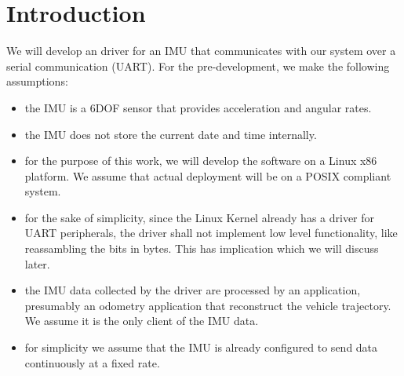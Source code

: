 \section{Introduction}
We will develop an driver for an IMU that communicates with our system over a serial communication (UART).
For the pre-development, we make the following assumptions:
\begin{itemize}
    \item the IMU is a 6DOF sensor that provides acceleration and angular rates.
    \item the IMU does not store the current date and time internally.
    \item for the purpose of this work, we will develop the software on a Linux x86 platform. We assume that actual deployment will be on a POSIX compliant system.
    \item for the sake of simplicity, since the Linux Kernel already has a driver for UART peripherals, the driver shall not implement low level functionality, like reassambling the bits in bytes. This has implication which we will discuss later.
    \item the IMU data collected by the driver are processed by an application, presumably an odometry application that reconstruct the vehicle trajectory.
    We assume it is the only client of the IMU data.
    \item for simplicity we assume that the IMU is already configured to send data continuously at a fixed rate.
\end{itemize}
